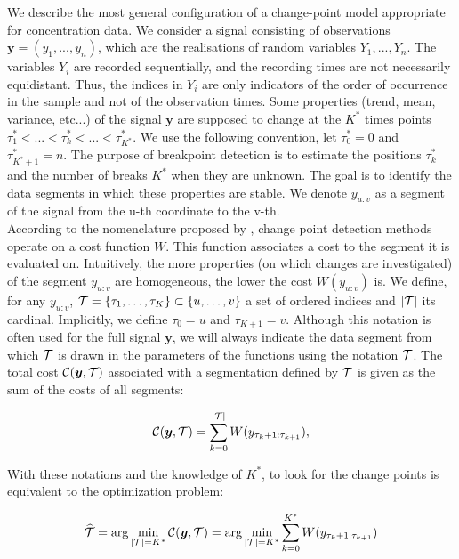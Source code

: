 We describe the most general configuration of a change-point model appropriate for concentration data. We consider a signal consisting of observations $\bm y = (y_1,...,y_n)$, which are the realisations of random variables $Y_1,...,Y_n$. The variables $Y_i$ are recorded sequentially, and the recording times are not necessarily equidistant. Thus, the indices in $Y_i$ are only indicators of the order of occurrence in the sample and not of the observation times. Some properties (trend, mean, variance, etc...) of the signal $\bm y$ are supposed to change at the $K^*$ times points $\tau^*_1 <... < \tau^*_k <... < \tau^*_{K^*}$. We use the following convention, let $\tau^*_0 = 0$ and $\tau^*_{K^*+1} = n$. The purpose of breakpoint detection is to estimate the positions $\tau^*_k$ and the number of breaks $K^*$ when they are unknown. The goal is to identify the data segments in which these properties are stable. We denote $y_{u:v}$ as a segment of the signal from the u-th coordinate to the v-th. \\
According to the nomenclature proposed by \cite{truong2020}, change point detection methods operate on a cost function $W$. This function associates a cost to the segment it is evaluated on. Intuitively, the more properties (on which changes are investigated) of the segment $y_{u:v}$ are homogeneous, the lower the cost $W(y_{u:v})$ is. We define, for any $y_{u:v}$, ${\mathcal T} = \{\tau_1,\dots,\tau_K\} \subset \{u,\dots,v\}$ a set of ordered indices and $\lvert {\mathcal T} \rvert$ its cardinal. Implicitly, we define $\tau_0 = u$ and $\tau_{K+1} = v$. Although this notation is often used for the full signal $\bm y$, we will always indicate the data segment from which ${\mathcal T}$ is drawn in the parameters of the functions using the notation ${\mathcal T}$. The total cost ${\mathcal C}(\bm y,{\mathcal T})$ associated with a segmentation defined by ${\mathcal T}$ is given as the sum of the costs of all segments:

\begin{equation}\label{chp:3:costfunc}
{\mathcal C}(\bm y,{\mathcal T}) = \sum_{k=0}^{\lvert {\mathcal T} \rvert} W(y_{\tau_k+1:\tau_{k+1}}), 
\end{equation}     

With these notations and the knowledge of $K^*$, to look for the change points is equivalent to the optimization problem:

\begin{equation}\label{chp:3:optKknown}
 \widehat{{\mathcal T}}  = \arg \min_{\lvert {\mathcal T} \rvert = K^*}  {\mathcal C}(\bm y, {\mathcal T}) = \arg \min_{\lvert {\mathcal T} \rvert = K^*} \sum_{k=0}^{K^*} W(y_{\tau_k+1:\tau_{k+1}})   
\end{equation}

